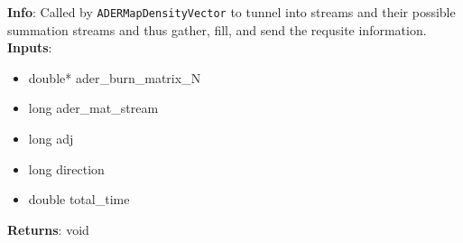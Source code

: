 \textbf{Info}: Called by \texttt{ADERMapDensityVector} to tunnel into streams
and their possible summation streams and thus gather, fill, and send the
requsite information.\\

\noindent \textbf{Inputs}:
\begin{itemize}
\item{double* ader\_burn\_matrix\_N}
\item{long ader\_mat\_stream}
\item{long adj}
\item{long direction}
\item{double total\_time}
\end{itemize}

\noindent \textbf{Returns}: void
